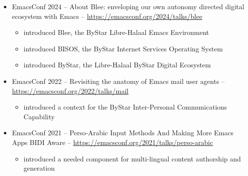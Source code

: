 \begin{whenOrg}
\begin{verblatex}
\begin{frame}[fragile,plain,label=PartOfByStar]
\begin{itemize}
    \item EmacsConf 2024 -- About Blee: enveloping our own autonomy directed digital ecosystem with Emacs -- \url{https://emacsconf.org/2024/talks/blee}
    \begin{itemize}
      \item introduced Blee, the ByStar Libre-Halaal Emacs Environment
      \item introduced BISOS, the ByStar Internet Services Operating System
      \item introduced ByStar, the Libre-Halaal ByStar Digital Ecosystem
    \end{itemize}
    \item EmacsConf 2022 -- Revisiting the anatomy of Emacs mail user agents -- \url{https://emacsconf.org/2022/talks/mail}
    \begin{itemize}
      \item introduced a context for the ByStar Inter-Personal Communications Capability
    \end{itemize}
    \item EmacsConf 2021 -- Perso-Arabic Input Methods And Making More Emacs Apps BIDI Aware -- \url{https://emacsconf.org/2021/talks/perso-arabic}
    \begin{itemize}
      \item introduced a needed component for multi-lingual content authorship and generation
    \end{itemize}
\end{itemize}

\end{frame}
\end{verblatex}






\end{whenOrg}
